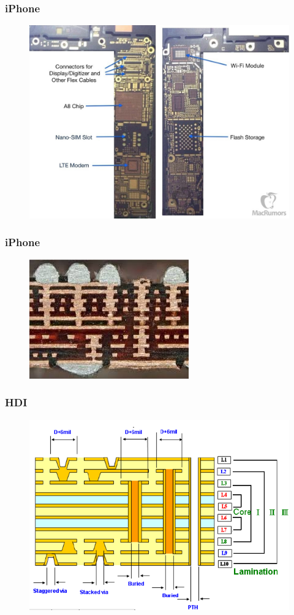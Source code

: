 \documentclass[t]{beamer}
\begin{document}
\begin{frame}
	\frametitle{iPhone}
	\begin{figure}
		\includegraphics[width=0.8\linewidth]{iphone.jpg}
	\end{figure}
\end{frame}
\begin{frame}
	\frametitle{iPhone}
	\begin{figure}
		\includegraphics[width=0.8\linewidth]{iphone2.jpg}
	\end{figure}
\end{frame}
\begin{frame}
	\frametitle{HDI}
	\begin{figure}
		\includegraphics[width=0.8\linewidth]{crossSection3.png}
	\end{figure}
\end{frame}
\end{document}
